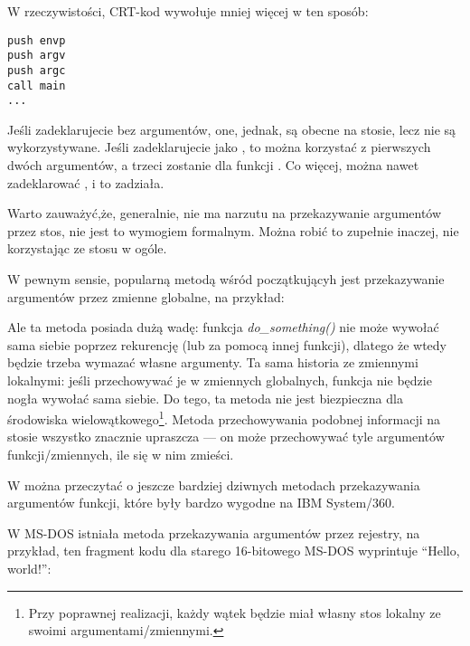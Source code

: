 W rzeczywistości, \ac{CRT}-kod wywołuje \main mniej więcej w ten sposób:
	
\begin{lstlisting}[style=customasmx86]
push envp
push argv
push argc
call main
...
\end{lstlisting}

Jeśli zadeklarujecie \main bez argumentów, one, jednak, są obecne na stosie, lecz nie są wykorzystywane.
Jeśli zadeklarujecie \main jako , 
to można korzystać z pierwszych dwóch argumentów, a trzeci zostanie dla funkcji .
Co więcej, można nawet zadeklarować , i to zadziała.



Warto zauważyć,że, generalnie, nie ma narzutu na przekazywanie argumentów przez stos, nie jest to wymogiem formalnym.
Można robić to zupełnie inaczej, nie korzystając ze stosu w ogóle.

W pewnym sensie, popularną metodą wśród początkującyh jest przekazywanie argumentów przez zmienne globalne, na przykład:



Ale ta metoda posiada dużą wadę: funkcja \emph{do\_something()} nie może wywołać sama siebie poprzez rekurencję (lub za pomocą innej funkcji),
dlatego że wtedy będzie trzeba wymazać własne argumenty.
Ta sama historia ze zmiennymi lokalnymi: jeśli przechowywać je w zmiennych globalnych, funkcja nie będzie nogła wywołać sama siebie.
Do tego, ta metoda nie jest biezpieczna dla środowiska wielowątkowego\footnote{Przy poprawnej realizacji,
każdy wątek będzie miał własny stos lokalny ze swoimi argumentami/zmiennymi.}.
Metoda przechowywania podobnej informacji na stosie wszystko znacznie upraszcza ---
on może przechowywać tyle argumentów funkcji/zmiennych,
ile się w nim zmieści.

W  można przeczytać o jeszcze bardziej dziwnych metodach przekazywania argumentów funkcji, które były bardzo wygodne na
 IBM System/360.


W MS-DOS istniała metoda przekazywania argumentów przez rejestry, na przykład, ten fragment kodu dla starego 16-bitowego MS-DOS
wyprintuje ``Hello, world!'':

